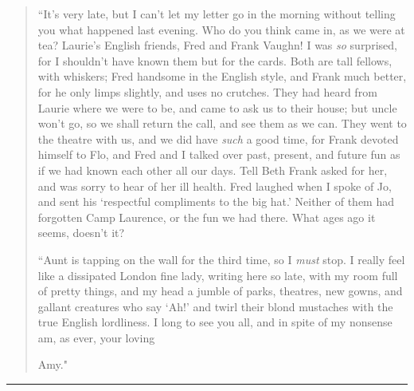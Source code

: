 \begin{quote}
``It's very late, but I can't let my
letter go in the morning without telling you what happened last evening.
Who do you think came in, as we were at tea? Laurie's
English friends, Fred and Frank Vaughn! I was \emph{so} surprised, for I
shouldn't have known them but for the cards. Both are
tall fellows, with whiskers; Fred handsome in the English style, and
Frank much better, for he only limps slightly, and uses no crutches.
They had heard from Laurie where we were to be, and came to ask us to
their house; but uncle won't go, so we shall return the
call, and see them as we can. They went to the theatre with us, and we
did have \emph{such} a good time, for Frank devoted himself to Flo, and
Fred and I talked over past, present, and future fun as if we had known
each other all our days. Tell Beth Frank asked for her, and was sorry to
hear of her ill health. Fred laughed when I spoke of Jo, and sent his
`respectful compliments to the big
hat.' Neither of them had forgotten Camp Laurence, or
the fun we had there. What ages ago it seems, doesn't
it?

``Aunt is tapping on the wall for the third time, so I \emph{must} stop.
I really feel like a dissipated London fine lady, writing here so late,
with my room full of pretty things, and my head a jumble of parks,
theatres, new gowns, and gallant creatures who say
`Ah!' and twirl their blond mustaches
with the true English lordliness. I long to see you all, and in spite of
my nonsense am, as ever, your loving

Amy."
\end{quote}

\begin{center}\rule{0.5\linewidth}{0.5pt}\end{center}

